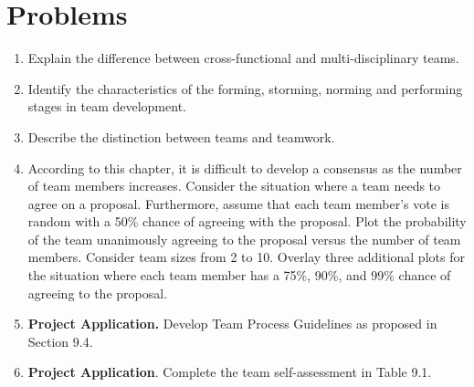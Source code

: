 \section{Problems}
\label{section:problems}

\begin{enumerate}
\def\labelenumi{\arabic{enumi}.}
\item
  Explain the difference between cross-functional and multi-disciplinary
  teams.
\item
  Identify the characteristics of the forming, storming, norming and
  performing stages in team development.
\item
  Describe the distinction between teams and teamwork.
\item
  According to this chapter, it is difficult to develop a consensus as
  the number of team members increases. Consider the situation where a
  team needs to agree on a proposal. Furthermore, assume that each team
  member's vote is random with a 50\% chance of agreeing with the
  proposal. Plot the probability of the team unanimously agreeing to the
  proposal versus the number of team members. Consider team sizes from 2
  to 10. Overlay three additional plots for the situation where each
  team member has a 75\%, 90\%, and 99\% chance of agreeing to the
  proposal.
\item
  \textbf{Project Application.} Develop Team Process Guidelines as
  proposed in Section 9.4.
\item
  \textbf{Project Application}. Complete the team self-assessment in
  Table 9.1.
\end{enumerate}
